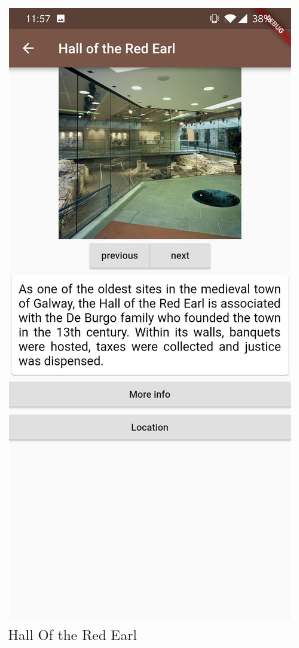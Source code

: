\begin{figure}[ht!]
    \centering
 \includegraphics[width=75mm,height=162mm]{img/HallRedEarl.jpg}
\caption{Hall Of the Red Earl}
\label{fig:Hall Of the Red Earl}
\end{figure}

